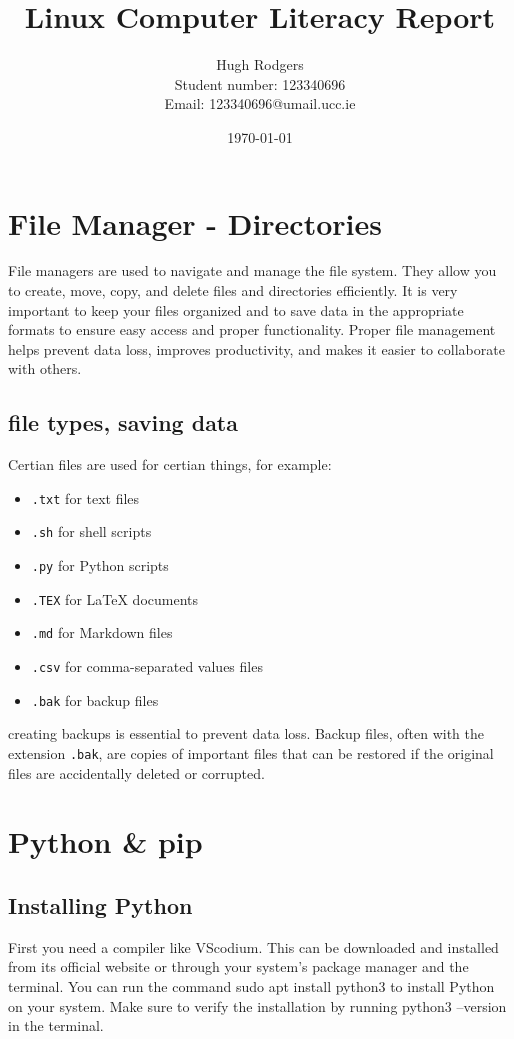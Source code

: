 \documentclass[a4paper,11pt]{article}
\title{Linux Computer Literacy Report}
\author{Hugh Rodgers \\ Student number: 123340696 \\ Email: 123340696@umail.ucc.ie}
\date{\today}
\begin{document}
    \maketitle

    \tableofcontents
    \newpage  


    \section{File Manager - Directories}
        File managers are used to navigate and manage the file system. They allow you to create, move, copy, and delete files and directories efficiently.
        It is very important to keep your files organized and to save data in the appropriate formats to ensure easy access and proper functionality.
        Proper file management helps prevent data loss, improves productivity, and makes it easier to collaborate with others.
        

        \subsection{file types, saving data}
            Certian files are used for certian things, for example:
            \begin{itemize}
                \item \texttt{.txt} for text files
                \item \texttt{.sh} for shell scripts
                \item \texttt{.py} for Python scripts
                \item \texttt{.TEX} for LaTeX documents
                \item \texttt{.md} for Markdown files
                \item \texttt{.csv} for comma-separated values files
                \item \texttt{.bak} for backup files
            \end{itemize}

        creating backups is essential to prevent data loss. Backup files, often with the extension \texttt{.bak}, are copies of important files that can be restored if the original files are accidentally deleted or corrupted.


    \section{Python \& pip}

        \subsection{Installing Python}
        First you need a compiler like VScodium. This can be downloaded and installed from its official website or through your system's package manager and the terminal.
        You can run the command sudo apt install python3 to install Python on your system. Make sure to verify the installation by running python3 --version in the terminal.
        
\end{document}
